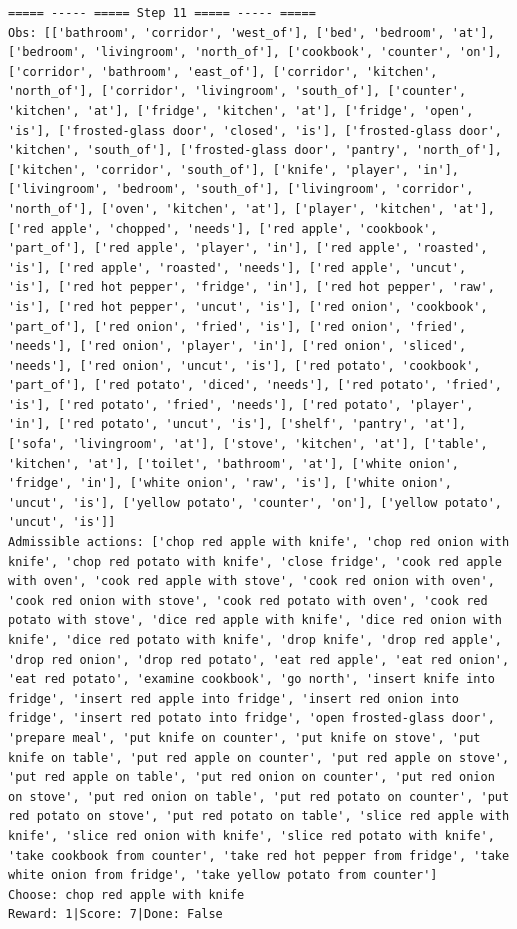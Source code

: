 \documentclass[11pt]{article}
\begin{document}
\begin{lstlisting}
===== ----- ===== Step 11 ===== ----- =====
Obs: [['bathroom', 'corridor', 'west_of'], ['bed', 'bedroom', 'at'], ['bedroom', 'livingroom', 'north_of'], ['cookbook', 'counter', 'on'], ['corridor', 'bathroom', 'east_of'], ['corridor', 'kitchen', 'north_of'], ['corridor', 'livingroom', 'south_of'], ['counter', 'kitchen', 'at'], ['fridge', 'kitchen', 'at'], ['fridge', 'open', 'is'], ['frosted-glass door', 'closed', 'is'], ['frosted-glass door', 'kitchen', 'south_of'], ['frosted-glass door', 'pantry', 'north_of'], ['kitchen', 'corridor', 'south_of'], ['knife', 'player', 'in'], ['livingroom', 'bedroom', 'south_of'], ['livingroom', 'corridor', 'north_of'], ['oven', 'kitchen', 'at'], ['player', 'kitchen', 'at'], ['red apple', 'chopped', 'needs'], ['red apple', 'cookbook', 'part_of'], ['red apple', 'player', 'in'], ['red apple', 'roasted', 'is'], ['red apple', 'roasted', 'needs'], ['red apple', 'uncut', 'is'], ['red hot pepper', 'fridge', 'in'], ['red hot pepper', 'raw', 'is'], ['red hot pepper', 'uncut', 'is'], ['red onion', 'cookbook', 'part_of'], ['red onion', 'fried', 'is'], ['red onion', 'fried', 'needs'], ['red onion', 'player', 'in'], ['red onion', 'sliced', 'needs'], ['red onion', 'uncut', 'is'], ['red potato', 'cookbook', 'part_of'], ['red potato', 'diced', 'needs'], ['red potato', 'fried', 'is'], ['red potato', 'fried', 'needs'], ['red potato', 'player', 'in'], ['red potato', 'uncut', 'is'], ['shelf', 'pantry', 'at'], ['sofa', 'livingroom', 'at'], ['stove', 'kitchen', 'at'], ['table', 'kitchen', 'at'], ['toilet', 'bathroom', 'at'], ['white onion', 'fridge', 'in'], ['white onion', 'raw', 'is'], ['white onion', 'uncut', 'is'], ['yellow potato', 'counter', 'on'], ['yellow potato', 'uncut', 'is']]
Admissible actions: ['chop red apple with knife', 'chop red onion with knife', 'chop red potato with knife', 'close fridge', 'cook red apple with oven', 'cook red apple with stove', 'cook red onion with oven', 'cook red onion with stove', 'cook red potato with oven', 'cook red potato with stove', 'dice red apple with knife', 'dice red onion with knife', 'dice red potato with knife', 'drop knife', 'drop red apple', 'drop red onion', 'drop red potato', 'eat red apple', 'eat red onion', 'eat red potato', 'examine cookbook', 'go north', 'insert knife into fridge', 'insert red apple into fridge', 'insert red onion into fridge', 'insert red potato into fridge', 'open frosted-glass door', 'prepare meal', 'put knife on counter', 'put knife on stove', 'put knife on table', 'put red apple on counter', 'put red apple on stove', 'put red apple on table', 'put red onion on counter', 'put red onion on stove', 'put red onion on table', 'put red potato on counter', 'put red potato on stove', 'put red potato on table', 'slice red apple with knife', 'slice red onion with knife', 'slice red potato with knife', 'take cookbook from counter', 'take red hot pepper from fridge', 'take white onion from fridge', 'take yellow potato from counter']
Choose: chop red apple with knife
Reward: 1|Score: 7|Done: False


\end{lstlisting}
\end{document}
